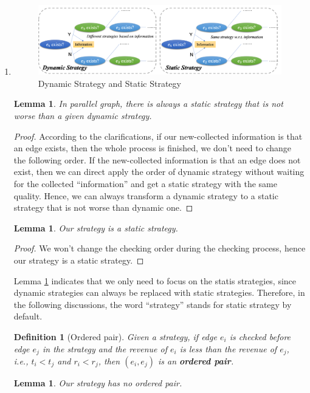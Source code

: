 \documentclass{oxmathproblems}
\makeatletter
\newtheorem{lemma}[theorem]{Lemma}
\newtheorem{definition}{Definition}
\theoremstyle{definition}
\renewenvironment{solution}[1][Solution] {\par\pushQED{\qed}\normalfont\topsep6\p@\@plus6\p@\relax\trivlist\item[\hskip\labelsep\bfseries#1\@addpunct{.}]\ignorespaces}{\popQED\endtrivlist\@endpefalse} \makeatother
\makeatother
\begin{document}
\begin{enumerate}
\begin{solution}
\begin{figure}[htbp]
	\centering
	\includegraphics[width=12cm]{2-dynamic-static.png}
	\caption{Dynamic Strategy and Static Strategy}
	\label{fig4}
\end{figure}
	
	\begin{lemma}\label{lemma1}
	In parallel graph, there is always a static strategy that is not worse than a given dynamic strategy.
	\end{lemma}
	\begin{proof}
	According to the clarifications, if our new-collected information is that an edge exists, then the whole process is finished, we don't need to change the following order. If the new-collected information is that an edge does not exist, then we can direct apply the order of dynamic strategy without waiting for the collected ``information'' and get a static strategy with the same quality. Hence, we can always transform a dynamic strategy to a static strategy that is not worse than dynamic one.
	\end{proof}
	\begin{lemma}\label{lemma2}
		Our strategy is a static strategy.
	\end{lemma}
	\begin{proof}
	We won't change the checking order during the checking process, hence our strategy is a static strategy.
	\end{proof}
	Lemma \ref{lemma1} indicates that we only need to focus on the statis strategies, since dynamic strategies can always be replaced with static strategies. Therefore, in the following discussions, the word ``strategy'' stands for static strategy by default.
	\begin{definition}[Ordered pair]\label{def3}
	Given a strategy, if edge $e_i$ is checked before edge $e_j$ in the strategy and the revenue of $e_i$ is less than the revenue of $e_j$, \textit{i.e.}, $t_i < t_j$ and $r_i < r_j$, then $(e_i, e_j)$ is an \textbf{ordered pair}.
	\end{definition}
	\begin{lemma}\label{lemma3}
		Our strategy has no ordered pair.
	\end{lemma}

\end{solution}
\end{enumerate}
\end{document}
